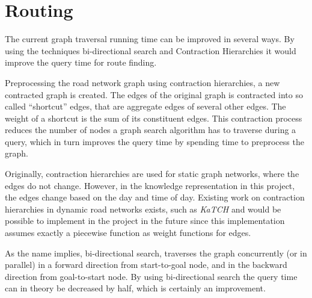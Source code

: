 \section{Routing}
The current graph traversal running time can be improved in several ways. By using the techniques bi-directional search and Contraction Hierarchies it would improve the query time for route finding.

Preprocessing the road network graph using contraction hierarchies, a new contracted graph is created. The edges of the original graph is contracted into so called “shortcut” edges, that are aggregate edges of  several other edges. The weight of a shortcut is the sum of its constituent edges. This contraction process reduces the number of nodes a graph search algorithm has to traverse during a query, which in turn improves the query time by spending time to preprocess the graph. 

Originally, contraction hierarchies are used for static graph networks, where the edges do not change. However, in the knowledge representation in this project, the edges change based on the day and time of day. Existing work on  contraction hierarchies in dynamic road networks exists,  such as \emph{KaTCH} \cite{KaTCH}\cite{KaTCHi} and would be possible to implement in the project in the future since this implementation assumes exactly a piecewise function as weight functions for edges.

As the name implies, bi-directional search, traverses the graph concurrently (or in parallel) in a forward direction from start-to-goal node, and in the backward direction from goal-to-start node. By using bi-directional search the query time can in theory be decreased by half, which is certainly an improvement.


